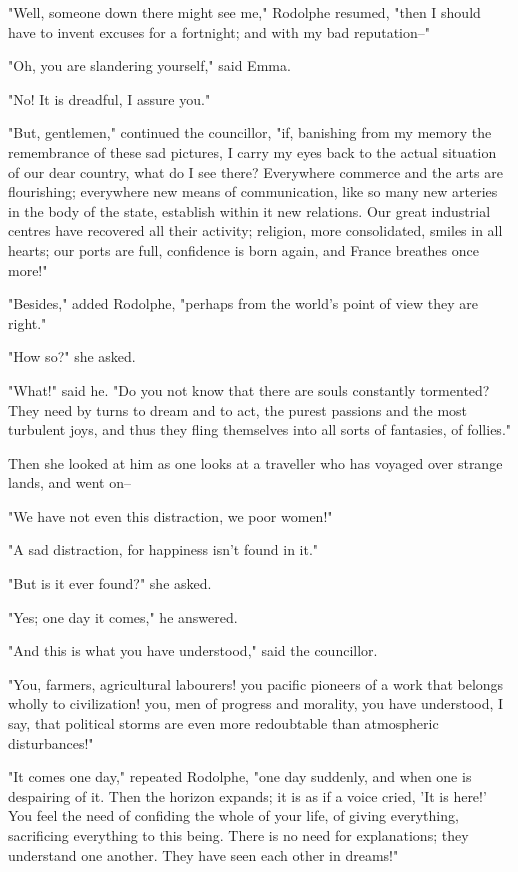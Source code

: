 \documentclass{tufte-book}
\begin{document}
"Well, someone down there might see me," Rodolphe resumed, "then
I should have to invent excuses for a fortnight; and with my bad
reputation--"

"Oh, you are slandering yourself," said Emma.

"No! It is dreadful, I assure you."

"But, gentlemen," continued the councillor, "if, banishing from my
memory the remembrance of these sad pictures, I carry my eyes back
to the actual situation of our dear country, what do I see there?
Everywhere commerce and the arts are flourishing; everywhere new means
of communication, like so many new arteries in the body of the state,
establish within it new relations. Our great industrial centres have
recovered all their activity; religion, more consolidated, smiles in
all hearts; our ports are full, confidence is born again, and France
breathes once more!"

"Besides," added Rodolphe, "perhaps from the world's point of view they
are right."

"How so?" she asked.

"What!" said he. "Do you not know that there are souls constantly
tormented? They need by turns to dream and to act, the purest passions
and the most turbulent joys, and thus they fling themselves into all
sorts of fantasies, of follies."

Then she looked at him as one looks at a traveller who has voyaged over
strange lands, and went on--

"We have not even this distraction, we poor women!"

"A sad distraction, for happiness isn't found in it."

"But is it ever found?" she asked.

"Yes; one day it comes," he answered.

"And this is what you have understood," said the councillor.

"You, farmers, agricultural labourers! you pacific pioneers of a work
that belongs wholly to civilization! you, men of progress and morality,
you have understood, I say, that political storms are even more
redoubtable than atmospheric disturbances!"

"It comes one day," repeated Rodolphe, "one day suddenly, and when
one is despairing of it. Then the horizon expands; it is as if a voice
cried, 'It is here!' You feel the need of confiding the whole of your
life, of giving everything, sacrificing everything to this being. There
is no need for explanations; they understand one another. They have seen
each other in dreams!"
\end{document}
